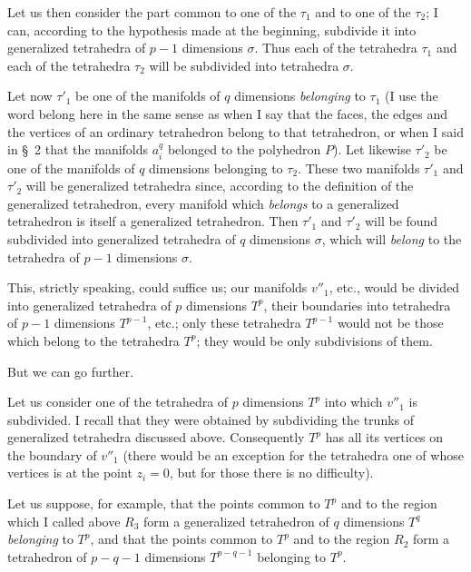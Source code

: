 \documentclass{article}
\begin{document}
Let us then consider the part common to one of the $\tau_{1}$ and to one of the $\tau_{2}$; I can, according to the hypothesis made at the beginning, subdivide it into generalized tetrahedra of $p - 1$ dimensions $\sigma$. Thus each of the tetrahedra $\tau_{1}$ and each of the tetrahedra $\tau_{2}$ will be subdivided into tetrahedra $\sigma$.

Let now $\tau'_{1}$ be one of the manifolds of $q$ dimensions \emph{belonging} to $\tau_{1}$ (I use the word belong here in the same sense as when I say that the faces, the edges and the vertices of an ordinary tetrahedron belong to that tetrahedron, or when I said in \S~2 that the manifolds $a^{q}_{i}$ belonged to the polyhedron $P$). Let likewise $\tau'_{2}$ be one of the manifolds of $q$ dimensions belonging to $\tau_{2}$. These two manifolds $\tau'_{1}$ and $\tau'_{2}$ will be generalized tetrahedra since, according to the definition of the generalized tetrahedron, every manifold which \emph{belongs} to a generalized tetrahedron is itself a generalized tetrahedron. Then $\tau'_{1}$ and $\tau'_{2}$ will be found subdivided into generalized
tetrahedra of $q$ dimensions $\sigma$, which will \emph{belong} to the tetrahedra of $p - 1$ dimensions $\sigma$.

This, strictly speaking, could suffice us; our manifolds $v''_{1}$, etc., would be divided into generalized tetrahedra of $p$ dimensions $T^{p}$, their boundaries into tetrahedra of $p - 1$ dimensions $T^{p-1}$, etc.; only these tetrahedra $T^{p-1}$ would not be those which belong to the tetrahedra $T^{p}$; they would be only subdivisions of them.

But we can go further.

Let us consider one of the tetrahedra of $p$ dimensions $T^{p}$ into which $v''_{1}$ is subdivided. I recall that they were obtained by subdividing the trunks of generalized tetrahedra discussed above. Consequently $T^{p}$ has all its vertices on the boundary of $v''_{1}$ (there would be an exception for the tetrahedra one of whose vertices is at the point $z_{i} = 0$, but for those there is no difficulty).

Let us suppose, for example, that the points common to $T^{p}$ and to the region which I called above $R_{3}$ form a generalized tetrahedron of $q$ dimensions $T^{q}$ \emph{belonging} to $T^{p}$, and that the points common to $T^{p}$ and to the region $R_{2}$ form a tetrahedron of $p - q - 1$ dimensions $T^{p-q-1}$ belonging to $T^{p}$.
\end{document}
